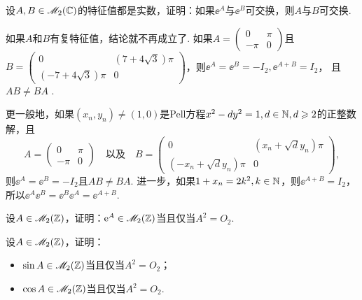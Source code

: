 \begin{mybox}
  \begin{problem}[交换指数.]

    设$A,B\in\mathscr M_2(\mathbb C)$的特征值都是实数，证明：如果$\ee^A$与$\ee^B$可交换，则$A$与$B$可交换.
    \begin{nota}
      如果$A$和$B$有复特征值，结论就不再成立了. 如果$A=\begin{pmatrix}
        0 & \pi \\
        -\pi & 0
      \end{pmatrix}$且$B=\begin{pmatrix}
        0 & (7+4\sqrt3)\pi \\
        (-7+4\sqrt3)\pi & 0
      \end{pmatrix}$，则$\ee^A=\ee^B=-I_2,\ee^{A+B}=I_2$，
      且$AB\ne BA$ \cite[p.709]{9}.

      更一般地，如果$(x_n,y_n)\ne(1,0)$是Pell方程$x^2-dy^2=1,d\in\mathbb N,d\geqslant2$的正整数解，且
      \[
        A = \begin{pmatrix}
          0 & \pi \\
          -\pi & 0
        \end{pmatrix}\quad \text{以及}\quad
        B = \begin{pmatrix}
          0 & (x_n+\sqrt dy_n) \pi \\
          (-x_n+\sqrt dy_n)\pi & 0
        \end{pmatrix},
      \]
      则$\ee^A=\ee^B=-I_2$且$AB\ne BA$. 进一步，如果$1+x_n=2k^2,k\in\mathbb N$，则$\ee^{A+B}=I_2$，所以$\ee^A\ee^B=\ee^B\ee^A=\ee^{A+B}$.
    \end{nota}
  \end{problem}
\end{mybox}

\begin{mybox}
  \begin{problem}

    设$A\in\mathscr M_2(\mathbb Z)$，证明：$\operatorname{\!\!\;\mathrm e}^A\in\mathscr M_2(\mathbb Z)$当且仅当$A^2=O_2$.
  \end{problem}
\end{mybox}

\begin{mybox}
  \begin{problem}[一个矩阵分析的瑰宝.]

    设$A\in\mathscr M_2(\mathbb Z)$，证明：
    \begin{itemize}
      \item $\sin A\in\mathscr M_2(\mathbb Z)$当且仅当$A^2=O_2$；
      \item $\cos A\in\mathscr M_2(\mathbb Z)$当且仅当$A^2=O_2$.
    \end{itemize}
  \end{problem}
\end{mybox}


